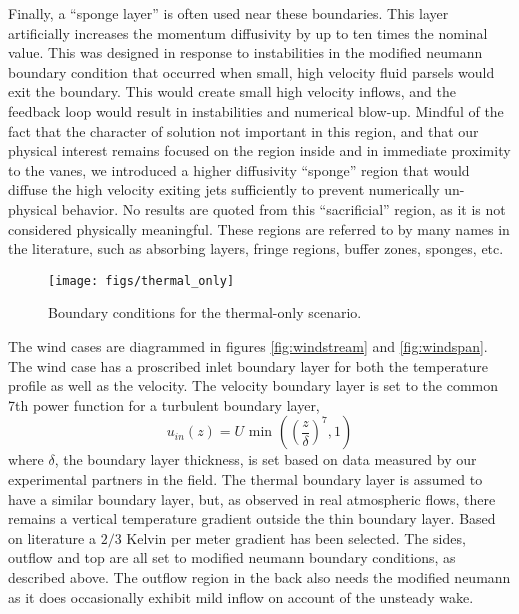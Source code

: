 Finally, a ``sponge layer'' is often used near these boundaries.
This layer artificially increases the momentum diffusivity by
up to ten times the nominal value. 
This was designed in response to instabilities in the modified 
neumann boundary condition that occurred when small, high velocity fluid
parsels would exit the boundary. This would create small high velocity inflows, and
the feedback loop would result in instabilities and numerical blow-up. Mindful of the fact 
that the character of solution not important in this region, and that
our physical interest remains focused on the region inside and
in immediate proximity to the vanes, we introduced a higher diffusivity
``sponge'' region that would diffuse the high velocity exiting jets
sufficiently to prevent numerically un-physical behavior. No results are
quoted from this ``sacrificial'' region, as it is not considered physically
meaningful. These regions are referred to by many names in the
literature\cite{doi:10.1146/annurev.fluid.36.050802.121930}, such as
absorbing layers, fringe regions, buffer zones, sponges, etc.

\begin{figure}[!htb]
  \begin{center}
    \texttt{[image: figs/thermal\_only]}
    \caption{Boundary conditions for the thermal-only scenario. }
    \label{fig:thermalbc}
  \end{center}
\end{figure}

The wind cases are diagrammed in figures \ref{fig:windstream} and \ref{fig:windspan}. The wind case has a proscribed inlet boundary layer
for both the temperature profile as well as the velocity. The velocity
boundary layer is set to the common 7th power function for a
turbulent boundary layer,  
\begin{equation*}
  u_{in}(z) = U \text{ min }\left(\left(\frac{z}{\delta}\right)^7,1\right)
\end{equation*}
where $\delta$, the boundary layer thickness, is set based on data
measured by our experimental partners in the field. 
The thermal boundary layer is assumed to have a similar boundary layer,
but, as observed in real atmospheric flows, there remains a vertical
temperature gradient outside the thin boundary layer. Based on
literature a $2/3$ Kelvin per meter gradient has been
selected\cite{Blocken2007238}. The sides, outflow and top are all set to
modified neumann boundary conditions, as described above. The outflow
region in the back also needs the modified neumann as it does
occasionally exhibit mild inflow on account of the unsteady wake. 

